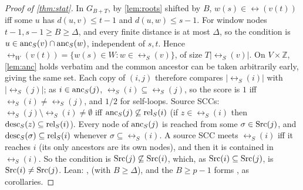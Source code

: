 \begin{proof}[Proof of \cref{thm:stat}]
In $G_{B+T}$, by \cref{lem:roots} shifted by $B$, $w(s)\in\rel(v(t))$ iff some
$u$ has $d(u,v)\le t-1$ and $d(u,w)\le s-1$. For window nodes $t-1,s-1\ge
B\ge\Delta$, and every finite distance is at most $\Delta$, so the condition is
$u\in\mathrm{anc}_S(v)\cap\mathrm{anc}_S(w)$, independent of $s,t$. Hence
$\rel_W(v(t))=\{w(s)\in W: w\in\rel_S(v)\}$, of size $T|\rel_S(v)|$. On
$V\times\mathbb Z$, \cref{lem:anc} holds verbatim and the common ancestor can
be taken arbitrarily early, giving the same set. Each copy of $(i,j)$ therefore
compares $|\rel_S(i)|$ with $|\rel_S(j)|$; as $i\in\mathrm{anc}_S(j)$,
$\rel_S(i)\subseteq\rel_S(j)$, so the score is $1$ iff
$\rel_S(i)\ne\rel_S(j)$, and $1/2$ for self-loops.
Source SCCs: $\rel_S(j)\setminus\rel_S(i)\ne\emptyset$ iff
$\mathrm{anc}_S(j)\not\subseteq\mathrm{rel}_S(i)$ (if $z\in\rel_S(i)$ then
$\mathrm{desc}_S(z)\subseteq\mathrm{rel}_S(i)$). Every node of $\mathrm{anc}_S(j)$ is reached from some
$\sigma\in\mathrm{Src}(j)$, and $\mathrm{desc}_S(\sigma)\subseteq\mathrm{rel}_S(i)$ whenever
$\sigma\subseteq\rel_S(i)$. A source SCC meets $\rel_S(i)$ iff it reaches $i$
(its only ancestors are its own nodes), and then it is contained in
$\rel_S(i)$. So the condition is $\mathrm{Src}(j)\not\subseteq\mathrm{Src}(i)$, which, as
$\mathrm{Src}(i)\subseteq\mathrm{Src}(j)$, is $\mathrm{Src}(i)\ne\mathrm{Src}(j)$. Lean:
,  (with $B\ge\Delta$), and the
$B\ge p-1$ forms ,  as corollaries.
\end{proof}

